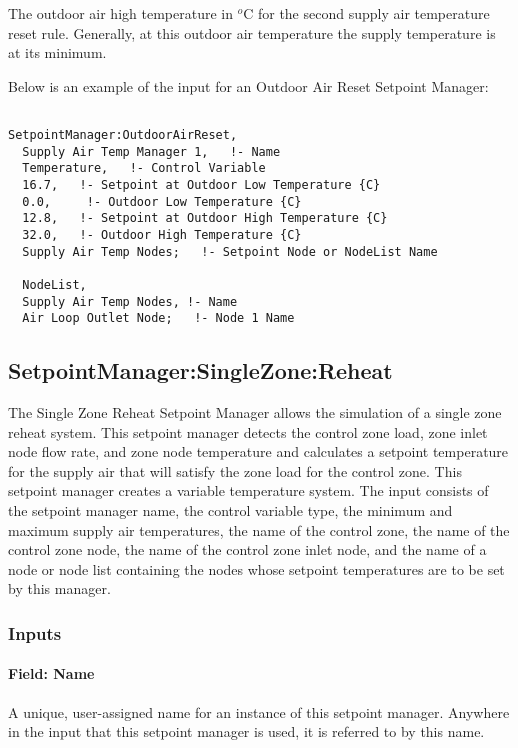 The outdoor air high temperature in \(^{o}\)C for the second supply air temperature reset rule. Generally, at this outdoor air temperature the supply temperature is at its minimum.

Below is an example of the input for an Outdoor Air Reset Setpoint Manager:

\begin{lstlisting}

SetpointManager:OutdoorAirReset,
  Supply Air Temp Manager 1,   !- Name
  Temperature,   !- Control Variable
  16.7,   !- Setpoint at Outdoor Low Temperature {C}
  0.0,     !- Outdoor Low Temperature {C}
  12.8,   !- Setpoint at Outdoor High Temperature {C}
  32.0,   !- Outdoor High Temperature {C}
  Supply Air Temp Nodes;   !- Setpoint Node or NodeList Name

  NodeList,
  Supply Air Temp Nodes, !- Name
  Air Loop Outlet Node;   !- Node 1 Name
\end{lstlisting}

\subsection{SetpointManager:SingleZone:Reheat}\label{setpointmanagersinglezonereheat}

The Single Zone Reheat Setpoint Manager allows the simulation of a single zone reheat system. This setpoint manager detects the control zone load, zone inlet node flow rate, and zone node temperature and calculates a setpoint temperature for the supply air that will satisfy the zone load for the control zone. This setpoint manager creates a variable temperature system. The input consists of the setpoint manager name, the control variable type, the minimum and maximum supply air temperatures, the name of the control zone, the name of the control zone node, the name of the control zone inlet node, and the name of a node or node list containing the nodes whose setpoint temperatures are to be set by this manager.

\subsubsection{Inputs}\label{inputs-3-033}

\paragraph{Field: Name}\label{field-name-3-029}

A unique, user-assigned name for an instance of this setpoint manager. Anywhere in the input that this setpoint manager is used, it is referred to by this name.

